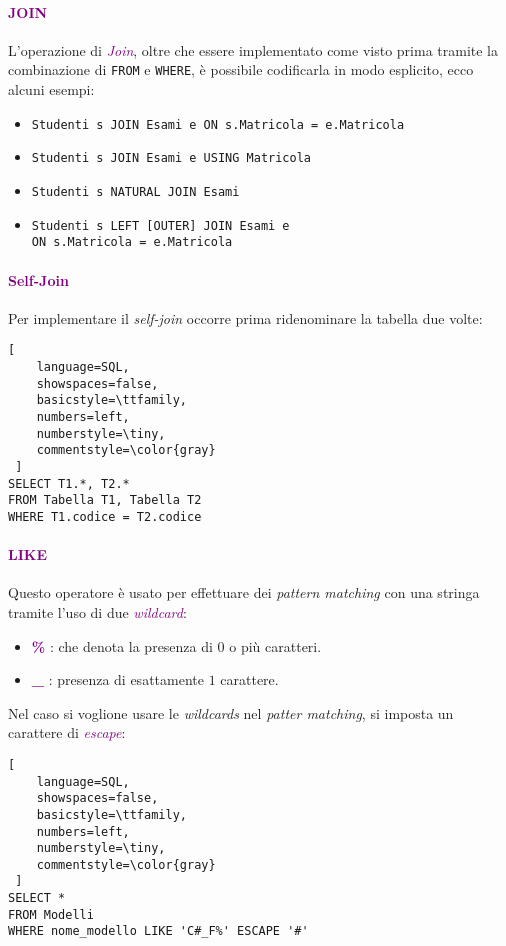 \paragraph{\textcolor{purple}{JOIN}} L'operazione di \emph{\textcolor{purple}{Join}}, oltre che essere implementato
come visto prima tramite la combinazione di \verb|FROM| e \verb|WHERE|, è possibile codificarla in modo esplicito, ecco alcuni esempi:
\begin{itemize}
    \item \verb|Studenti s JOIN Esami e ON s.Matricola = e.Matricola|
    \item \verb|Studenti s JOIN Esami e USING Matricola|
    \item \verb|Studenti s NATURAL JOIN Esami|
    \item \verb|Studenti s LEFT [OUTER] JOIN Esami e| \\
        \verb|ON s.Matricola = e.Matricola|
\end{itemize}

\paragraph{\textcolor{purple}{Self-Join}} Per implementare il \emph{self-join} occorre prima ridenominare
la tabella due volte:
\begin{lstlisting}[
    language=SQL,
    showspaces=false,
    basicstyle=\ttfamily,
    numbers=left,
    numberstyle=\tiny,
    commentstyle=\color{gray}
 ]
SELECT T1.*, T2.*
FROM Tabella T1, Tabella T2
WHERE T1.codice = T2.codice
\end{lstlisting}

\paragraph{\textcolor{purple}{LIKE}} Questo operatore è usato per effettuare dei \emph{pattern matching} con una stringa
tramite l'uso di due \emph{\textcolor{purple}{wildcard}}:
\begin{itemize}
    \item \textbf{\textcolor{purple}{\%}} : che denota la presenza di $0$ o più caratteri.
    \item \textbf{\textcolor{purple}{\_}} : presenza di esattamente $1$ carattere.
\end{itemize}

Nel caso si voglione usare le \emph{wildcards} nel \emph{patter matching}, si imposta un carattere di \emph{\textcolor{purple}{escape}}:
\begin{lstlisting}[
    language=SQL,
    showspaces=false,
    basicstyle=\ttfamily,
    numbers=left,
    numberstyle=\tiny,
    commentstyle=\color{gray}
 ]
SELECT *
FROM Modelli
WHERE nome_modello LIKE 'C#_F%' ESCAPE '#'
\end{lstlisting}

